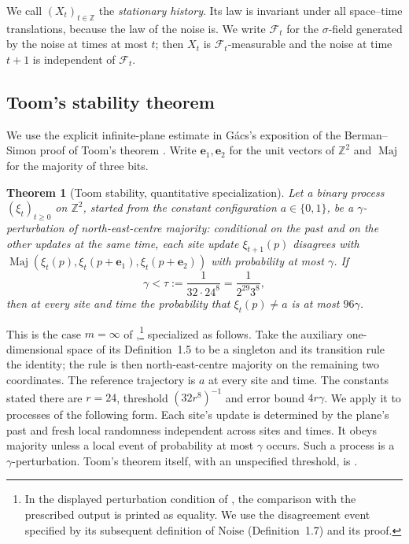 \documentclass[11pt]{article}
\theoremstyle{plain}
\newtheorem{theorem}{Theorem}[section]
\theoremstyle{definition}
\theoremstyle{remark}
\newcommand{\Z}{\mathbb Z}
\newcommand{\Maj}{\operatorname{Maj}}
\newcommand{\cF}{\mathcal F}
\begin{document}
We call $(X_t)_{t\in\Z}$ the \emph{stationary history}. Its law is invariant under all space--time translations, because the law of the noise is. We write $\cF_t$ for the $\sigma$-field generated by the noise at times at most $t$; then $X_t$ is $\cF_t$-measurable and the noise at time $t+1$ is independent of $\cF_t$.

\subsection{Toom's stability theorem}

We use the explicit infinite-plane estimate in G\'acs's exposition \cite{Gacs21} of the Berman--Simon proof \cite{BermanSimon88} of Toom's theorem \cite{Toom80}. Write $\mathbf e_1,\mathbf e_2$ for the unit vectors of $\Z^2$ and $\Maj$ for the majority of three bits.

\begin{theorem}[Toom stability, quantitative specialization]\label{thm:toom}
Let a binary process $(\xi_t)_{t\ge0}$ on $\Z^2$, started from the constant configuration $a\in\{0,1\}$, be a $\gamma$-perturbation of north-east-centre majority: conditional on the past and on the other updates at the same time, each site update $\xi_{t+1}(p)$ disagrees with $\Maj(\xi_t(p),\xi_t(p+\mathbf e_1),\xi_t(p+\mathbf e_2))$ with probability at most $\gamma$. If
\begin{equation}\label{eq:tau}
\gamma<\tau:=\frac1{32\cdot24^8}=\frac1{2^{29}3^8},
\end{equation}
then at every site and time the probability that $\xi_t(p)\ne a$ is at most $96\gamma$.
\end{theorem}

This is the case $m=\infty$ of \cite[Theorem~1.6]{Gacs21},\footnote{In the displayed perturbation condition of \cite[Definition~1.3]{Gacs21}, the comparison with the prescribed output is printed as equality. We use the disagreement event specified by its subsequent definition of $\mathrm{Noise}$ (Definition~1.7) and its proof.} specialized as follows. Take the auxiliary one-dimensional space of its Definition~1.5 to be a singleton and its transition rule the identity; the rule is then north-east-centre majority on the remaining two coordinates. The reference trajectory is $a$ at every site and time. The constants stated there are $r=24$, threshold $(32r^8)^{-1}$ and error bound $4r\gamma$. We apply it to processes of the following form. Each site's update is determined by the plane's past and fresh local randomness independent across sites and times. It obeys majority unless a local event of probability at most $\gamma$ occurs. Such a process is a $\gamma$-perturbation. Toom's theorem itself, with an unspecified threshold, is \cite{Toom80}.
\end{document}
